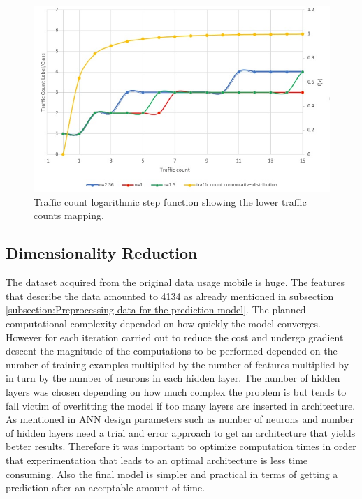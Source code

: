 \documentclass[12pt, a4paper]{report}
\theoremstyle{definition}
\theoremstyle{definition}%
\theoremstyle{definition}%
\theoremstyle{definition}%
\theoremstyle{definition}%
\theoremstyle{definition}%
\begin{document}
\begin{figure}[!]	
	\includegraphics[scale=0.60]{steps_function_zoom_in.jpg}
	\centering
	\caption{Traffic count logarithmic step function showing the lower traffic counts mapping. }
	\label{fig:label_classification_of_traffic_count_zoom_in}
\end{figure}


  




\subsection{Dimensionality Reduction}
The dataset acquired from the original data usage mobile is huge. The features that describe the data amounted to 4134 as already mentioned in subsection \ref{subsection:Preprocessing data for the prediction model}. The planned computational complexity depended on how quickly the model converges. However for each iteration carried out to reduce the cost and undergo gradient descent the magnitude of the computations to be performed depended on the number of training examples multiplied by the number of features multiplied by in turn by the number of neurons in each hidden layer. The number of hidden layers was chosen depending on how much complex the problem is but tends to fall victim of overfitting the model if too many layers are inserted in architecture. As mentioned in \cite{Jain1996} ANN design parameters such as number of neurons and number of hidden layers need a trial and error approach to get an architecture that yields better results. Therefore it was important to optimize computation times in order that experimentation that leads to an optimal architecture is less time consuming. Also the final model is simpler and practical in terms of getting a prediction after an acceptable amount of time.
\end{document}
